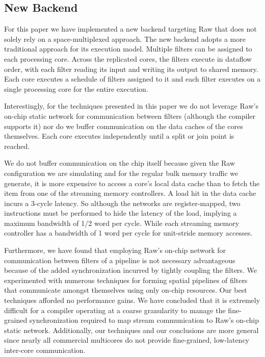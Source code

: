 \subsection{New Backend}
For this paper we have implemented a new backend targeting Raw that
does not solely rely on a space-multiplexed approach.  The new backend
adopts a more traditional approach for its execution model. Multiple
filters can be assigned to each processing core.  Across the
replicated cores, the filters execute in dataflow order, with each
filter reading its input and writing its output to shared memory. Each
core executes a schedule of filters assigned to it and each filter
executes on a single processing core for the entire execution.

Interestingly, for the techniques presented in this paper we do not
leverage Raw's on-chip static network for communication between
filters (although the compiler supports it) nor do we buffer
communication on the data caches of the cores themselves. Each core
executes independently until a split or join point is reached. 

We do not buffer communication on the chip itself because given the
Raw configuration we are simulating and for the regular bulk memory
traffic we generate, it is more expensive to access a core's local
data cache than to fetch the item from one of the streaming memory
controllers. A load hit in the data cache incurs a 3-cycle latency.
So although the networks are register-mapped, two instructions must be
performed to hide the latency of the load, implying a maximum
bandwidth of 1/2 word per cycle.  While each streaming memory
controller has a bandwidth of 1 word per cycle for unit-stride memory
accesses.

Furthermore, we have found that employing Raw's on-chip network for
communication between filters of a pipeline is not necessary
advantageous because of the added synchronization incurred by tightly
coupling the filters.  We experimented with numerous techniques for
forming spatial pipelines of filters that communicate amongst
themselves using only on-chip resources.  Our best techniques afforded
no performance gains.  We have concluded that it is extremely
difficult for a compiler operating at a coarse granularity to manage
the fine-grained synchronization required to map stream communication
to Raw's on-chip static network.  Additionally, our techniques and our
conclusions are more general since nearly all commercial multicores do
not provide fine-grained, low-latency inter-core communication.

